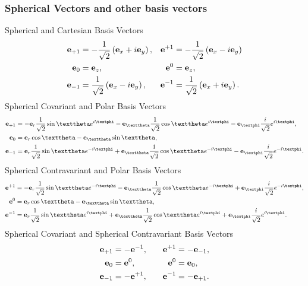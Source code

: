 \subsubsection{Spherical Vectors and other basis vectors}
Spherical and Cartesian Basis Vectors
\begin{alignat}{2}
\mathbf{e}_{+1} & =-\frac{1}{\sqrt{2}}\left(\mathbf{e}_{x}+i \mathbf{e}_{y}\right), & \mathbf{e}^{+1} & =-\frac{1}{\sqrt{2}}\left(\mathbf{e}_{x}-i \mathbf{e}_{y}\right)  \notag\\
\mathbf{e}_{0} & =\mathbf{e}_{z}, & \mathbf{e}^{0} & =\mathbf{e}_{z},  \label{eq:1:1:37}\\
\mathbf{e}_{-1} & =\frac{1}{\sqrt{2}}\left(\mathbf{e}_{x}-i \mathbf{e}_{y}\right), & \mathbf{e}^{-1} & =\frac{1}{\sqrt{2}}\left(\mathbf{e}_{x}+i \mathbf{e}_{y}\right). \notag
\end{alignat}
Spherical Covariant and Polar Basis Vectors
\begin{align}
\vect{e}_{+1} & =-\vect{e}_{r} \frac{1}{\sqrt{2}} \sin \vartheta e^{i \varphi}-\vect{e}_{\vartheta} \frac{1}{\sqrt{2}} \cos \vartheta e^{i \varphi}-\vect{e}_{\varphi} \frac{i}{\sqrt{2}} e^{i \varphi},  \notag\\
\vect{e}_{0} & =\vect{e}_{r} \cos \vartheta-\vect{e}_{\vartheta} \sin \vartheta,  \label{eq:1:1:38}\\
\vect{e}_{-1} & =\vect{e}_{r} \frac{1}{\sqrt{2}} \sin \vartheta e^{-i \varphi}+\vect{e}_{\vartheta} \frac{1}{\sqrt{2}} \cos \vartheta e^{-i \varphi}-\vect{e}_{\varphi} \frac{i}{\sqrt{2}} e^{-i \varphi} . \notag
\end{align}
Spherical Contravariant and Polar Basis Vectors
\begin{align}
\vect{e}^{+1} & =-\vect{e}_{r} \frac{1}{\sqrt{2}} \sin \vartheta e^{-i \varphi}-\vect{e}_{\vartheta} \frac{1}{\sqrt{2}} \cos \vartheta e^{-i \varphi}+\vect{e}_{\varphi} \frac{i}{\sqrt{2}} e^{-i \varphi},  \notag\\
\vect{e}^{0} & =\vect{e}_{r} \cos \vartheta-\vect{e}_{\vartheta} \sin \vartheta,  \label{eq:1:1:39}\\
\vect{e}^{-1} & =\vect{e}_{r} \frac{1}{\sqrt{2}} \sin \vartheta e^{i \varphi}+\vect{e}_{\vartheta} \frac{1}{\sqrt{2}} \cos \vartheta e^{i \varphi}+\vect{e}_{\varphi} \frac{i}{\sqrt{2}} e^{i \varphi} .\notag
\end{align}
Spherical Covariant and Spherical Contravariant Basis Vectors
\begin{alignat}{2}
\mathbf{e}_{+1} & =-\mathbf{e}^{-1}, \quad& \mathbf{e}^{+1} & =-\mathbf{e}_{-1},  \notag\\
\mathbf{e}_{0} & =\mathbf{e}^{0}, & \mathbf{e}^{0} & =\mathbf{e}_{0} , \label{eq:1:1:40}\\
\mathbf{e}_{-1} & =-\mathbf{e}^{+1}, & \mathbf{e}^{-1} & =-\mathbf{e}_{+1}. \notag
\end{alignat}
